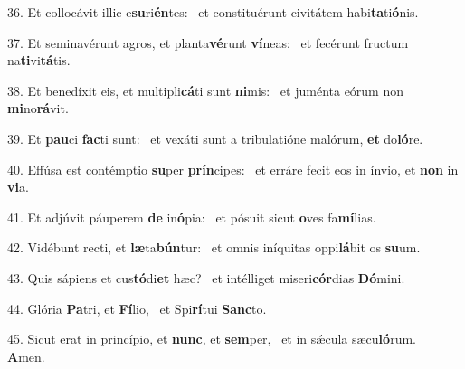 36. Et collocávit illic e\textbf{su}ri\textbf{én}tes: \ast\  et constituérunt civitátem habi\textbf{ta}ti\textbf{ó}nis.\

37. Et seminavérunt agros, et planta\textbf{vé}runt \textbf{ví}neas: \ast\  et fecérunt fructum na\textbf{ti}vi\textbf{tá}tis.\

38. Et benedíxit eis, et multipli\textbf{cá}ti sunt \textbf{ni}mis: \ast\  et juménta eórum non \textbf{mi}no\textbf{rá}vit.\

39. Et \textbf{pau}ci \textbf{fac}ti sunt: \ast\  et vexáti sunt a tribulatióne malórum, \textbf{et} do\textbf{ló}re.\

40. Effúsa est contémptio \textbf{su}per \textbf{prín}cipes: \ast\  et erráre fecit eos in ínvio, et \textbf{non} in \textbf{vi}a.\

41. Et adjúvit páuperem \textbf{de} in\textbf{ó}pia: \ast\  et pósuit sicut \textbf{o}ves fa\textbf{mí}lias.\

42. Vidébunt recti, et \textbf{læ}ta\textbf{bún}tur: \ast\  et omnis iníquitas oppi\textbf{lá}bit os \textbf{su}um.\

43. Quis sápiens et cus\textbf{tó}di\textbf{et} hæc? \ast\  et intélliget miseri\textbf{cór}dias \textbf{Dó}mini.\

44. Glória \textbf{Pa}tri, et \textbf{Fí}lio, \ast\  et Spi\textbf{rí}tui \textbf{Sanc}to.\

45. Sicut erat in princípio, et \textbf{nunc}, et \textbf{sem}per, \ast\  et in sǽcula sæcu\textbf{ló}rum. \textbf{A}men.\

